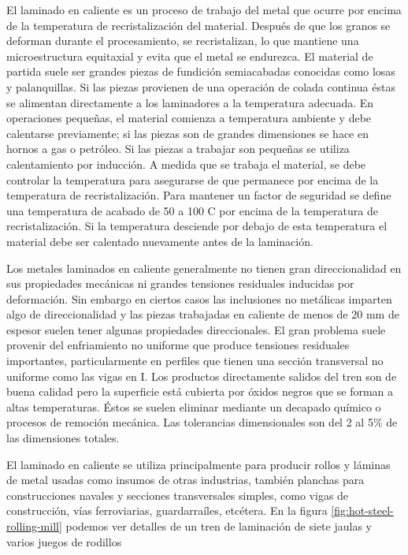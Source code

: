 El laminado en caliente es un proceso de trabajo del metal que ocurre por encima de la temperatura de recristalización del material. Después de que los granos se deforman durante el procesamiento, se recristalizan, lo que mantiene una microestructura equitaxial y evita que el metal se endurezca. El material de partida suele ser grandes piezas de fundición semiacabadas conocidas como losas y palanquillas. Si las piezas provienen de una operación de colada continua éstas se alimentan directamente a los laminadores a la temperatura adecuada. En operaciones pequeñas, el material comienza a temperatura ambiente y debe calentarse previamente; si las piezas son de grandes dimensiones se hace en hornos a gas o petróleo. Si las piezas a trabajar son pequeñas se utiliza calentamiento por inducción. A medida que se trabaja el material, se debe controlar la temperatura para asegurarse de que permanece por encima de la temperatura de recristalización. Para mantener un factor de seguridad se define una temperatura de acabado de 50 a 100 \textdegree C por encima de la temperatura de recristalización. Si la temperatura desciende por debajo de esta temperatura el material debe ser calentado nuevamente antes de la laminación.

Los metales laminados en caliente generalmente no tienen gran direccionalidad en sus propiedades mecánicas ni grandes tensiones residuales inducidas por deformación. Sin embargo en ciertos casos las inclusiones no metálicas imparten algo de direccionalidad y las piezas trabajadas en caliente de menos de 20 mm de espesor suelen tener algunas propiedades direccionales.
El gran problema suele provenir del enfriamiento no uniforme que produce tensiones residuales importantes, particularmente en perfiles que tienen una sección transversal no uniforme como las vigas en I. Los productos directamente salidos del tren son de buena calidad pero la superficie está cubierta por óxidos negros que se forman a altas temperaturas. Éstos se suelen eliminar mediante un decapado químico o procesos de remoción mecánica. Las tolerancias dimensionales son del 2 al 5\% de las dimensiones totales.

El laminado en caliente se utiliza principalmente para producir rollos y láminas de metal usadas como insumos de otras industrias, también planchas para construcciones navales y secciones transversales simples, como vigas de construcción, vías ferroviarias, guardarraíles, etcétera. En la figura \ref{fig:hot-steel-rolling-mill} podemos ver detalles de un tren de laminación de siete jaulas y varios juegos de rodillos


